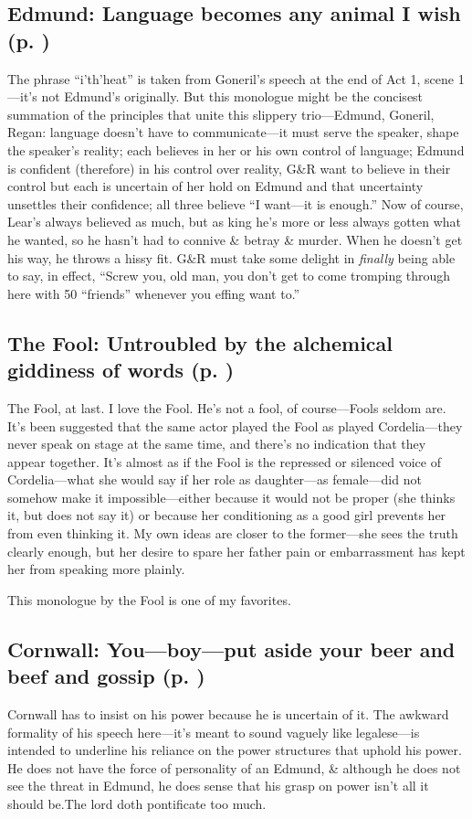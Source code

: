 \subsection*{Edmund: Language becomes any animal I wish (p. \pageref{ch:lear_ai})}
The phrase ``i'th'heat'' is taken from Goneril's speech at the end of Act 1, scene 1---it's not Edmund's originally. But this monologue might be the concisest summation of the principles that unite this slippery trio---Edmund, Goneril, Regan: language doesn't have to communicate---it must serve the speaker, shape the speaker's reality; each believes in her or his own control of language; Edmund is confident (therefore) in his control over reality, G\&R want to believe in their control but each is uncertain of her hold on Edmund and that uncertainty unsettles their confidence; all three believe ``I want---it is enough.'' Now of course, Lear's always believed as much, but as king he's more or less always gotten what he wanted, so he hasn't had to connive \& betray \& murder. When he doesn't get his way, he throws a hissy fit. G\&R must take some delight in \emph{finally} being able to say, in effect, ``Screw you, old man, you don't get to come tromping through here with 50 ``friends'' whenever you effing want to.''

\subsection*{The Fool: Untroubled by the alchemical giddiness of words (p. \pageref{ch:lear_aj})}
The Fool, at last. I love the Fool. He's not a fool, of course---Fools seldom are. It's been suggested that the same actor played the Fool as played Cordelia---they never speak on stage at the same time, and there's no indication that they appear together. It's almost as if the Fool is the repressed or silenced voice of Cordelia---what she would say if her role as daughter---as female---did not somehow make it impossible---either because it would not be proper (she thinks it, but does not say it) or because her conditioning as a good girl prevents her from even thinking it. My own ideas are closer to the former---she sees the truth clearly enough, but her desire to spare her father pain or embarrassment has kept her from speaking more plainly.

This monologue by the Fool is one of my favorites.

\subsection*{Cornwall: You---boy---put aside your beer and beef and gossip (p. \pageref{ch:lear_ak})}
Cornwall has to insist on his power because he is uncertain of it. The awkward formality of his speech here---it's meant to sound vaguely like legalese---is intended to underline his reliance on the power structures that uphold his power. He does not have the force of personality of an Edmund, \& although he does not see the threat in Edmund, he does sense that his grasp on power isn't all it should be.The lord doth pontificate too much.


